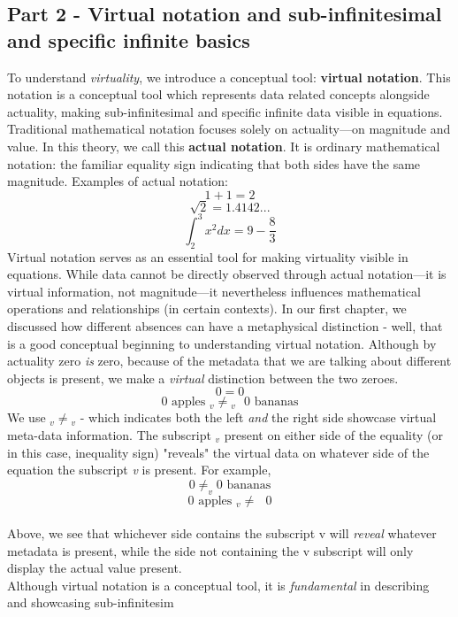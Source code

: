 \documentclass{article}
\begin{document}
\subsection{Part 2 - Virtual notation and sub-infinitesimal and specific infinite basics}
To understand \textit{virtuality}, we introduce a conceptual tool: \textbf{virtual notation}. This notation is a conceptual tool which represents data related concepts alongside actuality, making sub-infinitesimal and specific infinite data visible in equations. Traditional mathematical notation focuses solely on actuality—on magnitude and value. In this theory, we call this \textbf{actual notation}. It is ordinary mathematical notation: the familiar equality sign indicating that both sides have the same magnitude. Examples of actual notation:
$$1+1=2$$ 
$$\sqrt{2}=1.4142...$$ 
$$\int_2^3x^2dx=9-\frac{8}{3}$$
Virtual notation serves as an essential tool for making virtuality visible in equations. While data cannot be directly observed through actual notation—it is virtual information, not magnitude—it nevertheless influences mathematical operations and relationships (in certain contexts). In our first chapter, we discussed how different absences can have a metaphysical distinction - well, that is a good conceptual beginning to understanding virtual notation. Although by actuality zero \textit{is} zero, because of the metadata that we are talking about different objects is present, we make a \textit{virtual} distinction between the two zeroes. $$0=0$$ $$0 \text{ apples }{}_v{\neq}{}_v\text{ }0\text{ bananas}$$  We use ${}_v{\neq}{}_v$ - which indicates both the left \textit{and} the right side showcase virtual meta-data information. The subscript $_v$ present on either side of the equality (or in this case, inequality sign) "reveals" the virtual data on whatever side of the equation the subscript \textit{v} is present. For example, $$0\neq_v0\text{ bananas}$$ $$0\text{ apples }{}_v{\neq}\text{ } 0$$ \\Above, we see that whichever side contains the subscript v will \textit{reveal} whatever metadata is present, while the side not containing the v subscript will only display the actual value present. \\Although virtual notation is a conceptual tool, it is \textit{fundamental} in describing and showcasing sub-infinitesim
\end{document}
